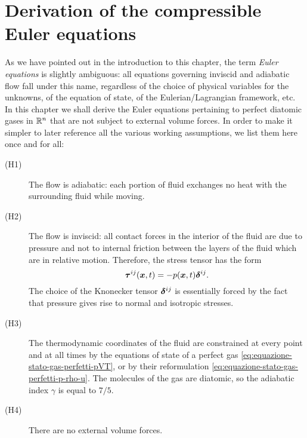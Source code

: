 


\section{Derivation of the compressible Euler equations}

As we have pointed out in the introduction to this chapter,
the term \emph{Euler equations} is slightly ambiguous: all equations
governing inviscid and adiabatic flow fall under this name,
regardless of the choice of physical variables for the unknowns,
of the equation of state, of the Eulerian/Lagrangian framework, etc.
In this chapter we shall derive the Euler equations pertaining
to perfect diatomic gases in $\mathbb{R}^n$ that are not subject to external
volume forces. In order to make it simpler to later reference all the
various working assumptions, we list them here once and for all:
\begin{description}
\item[(H1)] The flow is adiabatic: each portion of fluid exchanges
	no heat with the surrounding fluid while moving.
\item[(H2)] The flow is inviscid: all contact forces in the interior
	of the fluid are due to pressure and not to internal friction
	between the layers of the fluid which are in relative motion.
	Therefore, the stress tensor has the form
	\[
	\bm{\tau}^{ij}(\bm{x},t) = -p(\bm{x},t) \bm{\delta}^{ij}.
	\]
	The choice of the Knonecker tensor $\bm{\delta}^{ij}$ is essentially forced
	by the fact that pressure gives rise to normal and isotropic stresses.
\item[(H3)] The thermodynamic coordinates of the fluid are constrained
	at every point and at all times by the equations of state
	of a perfect gas \eqref{eq:equazione-stato-gas-perfetti-pVT},
	or by their reformulation \eqref{eq:equazione-stato-gas-perfetti-p-rho-u}.
	The molecules of the gas are diatomic, so the adiabatic index
	$\gamma$ is equal to $7/5$.
\item[(H4)] There are no external volume forces.
\end{description}

